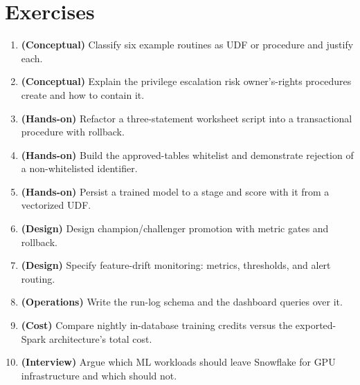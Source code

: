 \section{Exercises}
\begin{enumerate}
    \item \textbf{(Conceptual)} Classify six example routines as UDF or procedure and justify each.
    \item \textbf{(Conceptual)} Explain the privilege escalation risk owner's-rights procedures create and how to contain it.
    \item \textbf{(Hands-on)} Refactor a three-statement worksheet script into a transactional procedure with rollback.
    \item \textbf{(Hands-on)} Build the approved-tables whitelist and demonstrate rejection of a non-whitelisted identifier.
    \item \textbf{(Hands-on)} Persist a trained model to a stage and score with it from a vectorized UDF.
    \item \textbf{(Design)} Design champion/challenger promotion with metric gates and rollback.
    \item \textbf{(Design)} Specify feature-drift monitoring: metrics, thresholds, and alert routing.
    \item \textbf{(Operations)} Write the run-log schema and the dashboard queries over it.
    \item \textbf{(Cost)} Compare nightly in-database training credits versus the exported-Spark architecture's total cost.
    \item \textbf{(Interview)} Argue which ML workloads should leave Snowflake for GPU infrastructure and which should not.
\end{enumerate}
